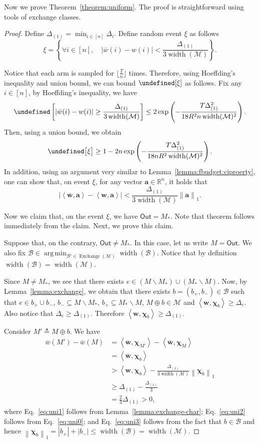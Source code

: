 \documentclass{article}
\newcommand{\M}{\mathcal M}
\newcommand{\B}{\mathcal B}
\newcommand{\del}{\backslash}
\newcommand{\RR}{\mathbb R}
\DeclareMathOperator{\rank}{width}
\DeclareMathOperator*{\argmin}{arg\,min}
\DeclareMathOperator{\Exchange}{Exchange}
\newcommand{\out}{\mathsf{Out}}
\let\Pr\undefined
\DeclareMathOperator{\Pr}{Pr}
\newcommand{\inn}[1]{\left\langle #1 \right\rangle}
\newcommand{\nor}[1]{\left\|#1\right\|}
\renewcommand{\vec}[1]{\boldsymbol{#1}}
\begin{document}
Now we prove Theorem~\ref{theorem:uniform}. 
The proof is straightforward using tools of exchange classes.
\begin{proof}
Define $\Delta_{(1)} = \min_{i\in [n]} \Delta_{i}$.
Define random event $\xi$ as follows
$$
\xi = \left\{ \forall i\in [n], \quad |\bar w(i) - w(i)| < \frac{\Delta_{(1)}}{3\rank(\M)} \right\}.
$$

Notice that each arm is sampled for $\lfloor \frac{T}{n} \rfloor$ times. 
Therefore, using Hoeffding's inequality and union bound, we can bound $\Pr[\xi]$ as follows.
Fix any $i\in[n]$, by Hoeffding's inequality, we have
$$
\Pr\left[ |\bar w(i)-w(i)| \ge  \frac{\Delta_{(1)}}{3\rank(\M)} \right] 
\le 2\exp\left(-\frac{T\Delta_{(1)}^2}{18R^2n\rank(\M)^2} \right).
$$
Then, using a union bound, we obtain
$$
\Pr\big[\xi \big] \ge 1-2n\exp\left(-\frac{T\Delta_{(1)}^2}{18 nR^2\rank(\M)^2} \right).
$$
In addition, using an argument very similar to Lemma~\ref{lemma:fbudget:ciproerty}, one can show that, on event $\xi$, for any vector $\vec a \in \RR^n$, it holds that 
\begin{equation}
\label{eq:uni0}
|\inn{\vec{\bar w}, \vec a}-\inn{\vec{w}, \vec a}|< \frac{\Delta_{(1)}}{3\rank(\M)}\nor{\vec a}_1.
\end{equation}

Now we claim that, on the event $\xi$, we have $\out=M_*$.
Note that theorem follows immediately from the claim. 
Next, we prove this claim.


Suppose that, on the contrary, $\out\not=M_*$.
In this case, let us write $M = \out$.
We also fix $\B\in\argmin_{\B'\in\Exchange(\M)} \rank(\B)$.
Notice that by definition $\rank(\B) = \rank(\M)$.

Since $M\not=M_*$, we see that there exists $e\in (M\del M_*) \cup (M_*\del M)$. 
Now, by Lemma~\ref{lemma:exchange}, we obtain that 
there exists $b=(b_+,b_-) \in \B$ such that $e\in b_+\cup b_-$, $b_- \subseteq M\del M_*$, $b_+\subseteq M_* \del M$,
$M \oplus b \in \M$ and $\inn{\vec w, \vec\chi_b} \ge \Delta_e$. Also notice that $\Delta_e \ge \Delta_{(1)}$. Therefore $\inn{\vec w,\vec\chi_b} \ge \Delta_{(1)}$.

Consider $M'\triangleq M\oplus b$. We have
\begin{align}
\bar w(M')-\bar w(M) &= \inn{\vec{\bar w}, \vec \chi_{M'}}-\inn{\vec{\bar w}, \vec \chi_{M}} \nonumber\\
                     &=\inn{\vec{\bar w}, \vec \chi_{b}} \label{eq:uni1} \\
                     &> \inn{\vec{w}, \vec \chi_{b}}-\frac{\Delta_{(1)}}{3\rank(\M)} \nor{\vec\chi_{b}}_1 \label{eq:uni2}\\
                     &\ge \Delta_{(1)} - \frac{\Delta_{(1)}}{3}\label{eq:uni3}\\
                     &= \frac{2}{3} \Delta_{(1)} > 0,
\end{align}
where Eq.~\eqref{eq:uni1} follows from Lemma~\ref{lemma:exchange-char}; Eq.~\eqref{eq:uni2} follows from Eq.~\eqref{eq:uni0}; and Eq.~\eqref{eq:uni3} follows from the fact that $b\in \B$ and hence $\nor{\vec\chi_b}_1 = |b_+|+|b_-| \le \rank(\B) = \rank(\M)$.


\end{proof}
\end{document}
